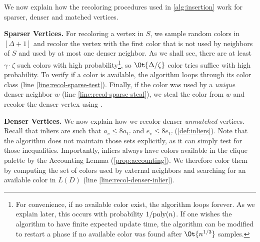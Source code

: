 \documentclass[a4paper,english,11pt]{amsart}
\renewcommand{\paragraph}[1]{\medskip\noindent\textbf{#1}}
\theoremstyle{definition}
\renewcommand{\leq}{\leqslant}
\newcommand{\poly}{\mbox{\rm poly}}
\newcommand{\col}{\varphi}
\newcommand{\NS}{N_{S}}
\newcommand{\ND}{N_{V\setminus S}}
\begin{document}
We now explain how the recoloring procedures used in \cref{alg:insertion} work for sparser, denser and matched vertices.


\paragraph{Sparser Vertices.}
For recoloring a vertex in $S$, we sample random colors in $[\Delta+1]$ and recolor the vertex with the first color that is not used by neighbors of $S$ and used by at most one denser neighbor. As we shall see, there are at least $\gamma \cdot \zeta$ such colors with high probability\footnote{For convenience, if no available color exist, the algorithm loops forever. As we explain later, this occurs with probability $1/\poly(n)$. If one wishes the algorithm to have finite expected update time, the algorithm can be modified to restart a phase if no available color was found after $\Ot{ n^{1/3} }$ samples.}, so $\Ot{ \Delta /\zeta }$ color tries suffice with high probability. To verify if a color is available, the algorithm loops through its color class (line \ref{line:recol-sparse-test}). Finally, if the color was used by a \emph{unique} denser neighbor $w$ (line \ref{line:recol-sparse-steal}), we steal the color from $w$ and recolor the denser vertex using \RecolorDense.



\paragraph{Denser Vertices.}
We now explain how we recolor denser \emph{unmatched} vertices.
Recall that inliers are such that $a_v \leq 8a_C$ and $e_v \leq 8e_C$ (\cref{def:inliers}). Note that the algorithm does not maintain those sets explicitly, as it can simply test for those inequalities. Importantly, inliers always have colors available in the clique palette by the Accounting Lemma (\cref{prop:accounting}). We therefore color them by computing the set of colors used by external neighbors and searching for an available color in $L(D)$ (line \ref{line:recol-denser-inlier}).
\end{document}
